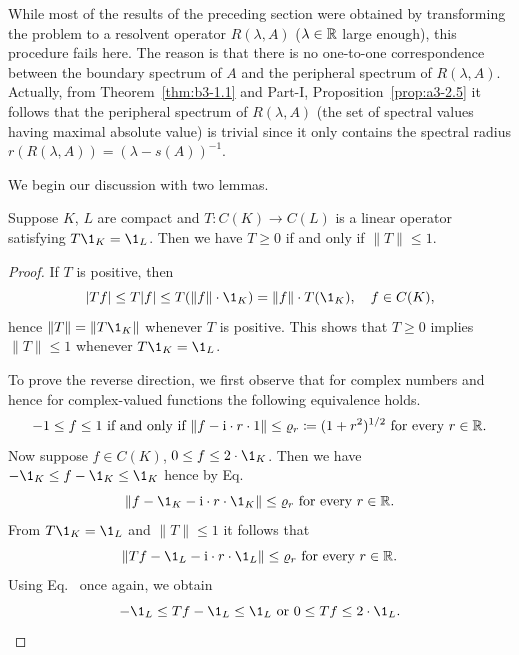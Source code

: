 While most of the results of the preceding section were obtained by transforming the problem to a resolvent operator $R(\lambda,A)$ ($\lambda \in \mathbb{R}$ large enough), this procedure fails here.
The reason is that there is no one-to-one correspondence between the boundary spectrum of\/ $A$ and the peripheral spectrum of\/ $R(\lambda,A)$.
Actually, from Theorem~\ref{thm:b3-1.1} and Part-I, Proposition~\ref{prop:a3-2.5} it follows that the peripheral spectrum of\/ $R(\lambda,A)$ (\ie the set of spectral values having maximal absolute value) is trivial since it only contains the spectral radius $r(R(\lambda,A)) = (\lambda - s(A))^{-1}$.

We begin our discussion with two lemmas.
\begin{lemma}\label{lem:b3-2.1}
	Suppose $K$, $L$ are compact and $T \colon C(K) \to C(L)$ is a linear operator satisfying $T \1_{K} = \1_{L}$.
	Then we have $T \geq 0$ if and only if\/ $\|T\| \leq 1$.
\end{lemma}
\begin{proof}
	If\/ $T$ is positive, then
	\begin{equation}\label{eq:b3-2.1}
	|Tf| \leq T|f| \leq T(\|f\|\cdot \1_{K}) = \|f\|\cdot T(\1_{K}), \quad f \in C(K) , 
	\end{equation}
	hence $\|T\| = \|T\1_{K}\|$ whenever $T$ is positive.
	This shows that $T \geq 0$ implies $\|T\| \leq 1$ whenever $T\1_{K} = \1_{L}$.
	
	To prove the reverse direction, we first observe that for complex numbers and hence for complex-valued functions the following equivalence holds.
	\begin{equation}\label{eq:b3-2.2}
	-1 \leq f \leq 1 \text{ if and only if } \|f - \im\cdot r\cdot 1\| \leq \rho_{r} \coloneq (1+r^{2})^{1/2} \text{ for every } r \in \R.
	\end{equation}
	Now suppose $f \in C(K)$, $0 \leq f \leq 2\cdot \1_{K}$.
	Then we have $-\1_{K} \leq f - \1_{K} \leq \1_{K}$ hence by Eq.~ 
    \[\|f - \1_{K} - \im\cdot r\cdot \1_{K}\| \leq \rho_{r}  \text{ for every } r \in \R .
    \]
	From $T\1_{K} = \1_{L}$ and $\|T\| \leq 1$ it follows that 
    \[
    \|Tf - \1_{L} - \im\cdot r\cdot \1_{L}\| \leq \rho_{r} \text{ for every } r \in \R .
    \]
	Using Eq.~ once again, we obtain 
\begin{equation*}
    -\1_{L} \leq Tf - \1_{L} \leq \1_{L}\text{ or } 0 \leq Tf \leq 2\cdot \1_{L}. 
    \qedhere
\end{equation*}
\end{proof}
